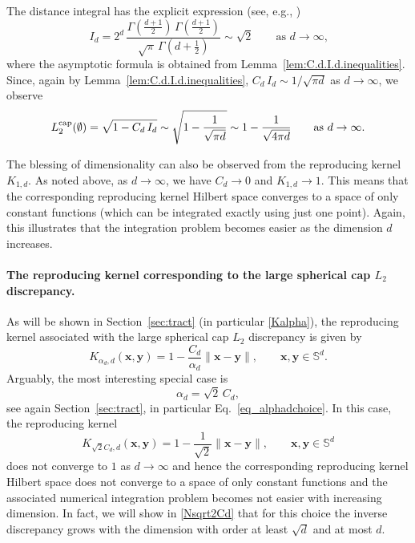 \documentclass[12pt]{article}
\newcommand{\cp}{{\rm cap}}
\begin{document}
The distance integral has the explicit expression (see, e.g., \cite{BSSW14})
\begin{equation}
\label{eq:I.d.value}
I_d = 2^d \, \frac{\Gamma( \tfrac{d + 1}{2} ) \, \Gamma( \tfrac{d + 1}{2} )}{\sqrt{\pi} \, \Gamma( d + \tfrac{1}{2} )}
\sim
\sqrt{2} 
\qquad
\text{as $d \to \infty$,}
\end{equation}
where the asymptotic formula is obtained from Lemma~\ref{lem:C.d.I.d.inequalities}. Since, again by Lemma~\ref{lem:C.d.I.d.inequalities}, $C_d \, I_d \sim 1/\sqrt{\pi d}$ as $d \to \infty$, we observe
\begin{equation*}
L_2^{\cp}(\emptyset) = \sqrt{1 - C_d \, I_d} \sim \sqrt{ 1 - \frac{1}{\sqrt{\pi d}}} \sim 1 - \frac{1}{\sqrt{4\pi d}} \qquad \text{as $d \to \infty$.}
\end{equation*}

The blessing of dimensionality can also be observed from the reproducing kernel $K_{1,d}$. As noted above, as $d \to \infty$, we have $C_d \to 0$ and $K_{1,d} \to 1$. This means that the corresponding reproducing kernel Hilbert space converges to a space of only constant functions (which can be integrated exactly using just one point). Again, this illustrates that the integration problem becomes easier as the dimension $d$ increases.


\paragraph{The reproducing kernel corresponding to the large spherical cap $L_2$ discrepancy.} As will be shown in Section~\ref{sec:tract} (in particular \eqref{Kalpha}), the reproducing kernel associated with the large spherical cap $L_2$ discrepancy is given by
\begin{equation*}
K_{\alpha_d, d}(\bm{x}, \bm{y}) = 1 - \frac{C_d}{\alpha_d} \|\bm{x} - \bm{y}\|, \qquad \bm{x},\bm{y} \in \mathbb{S}^d.
\end{equation*}
Arguably, the most interesting special case is
\begin{equation*}
\alpha_d = \sqrt{2} \, C_d,
\end{equation*}
see again Section~\ref{sec:tract}, in particular Eq.~\eqref{eq_alphadchoice}. In this case, the reproducing kernel 
\begin{equation}\label{Ksqrt2Cd}
K_{\sqrt{2} C_d,d}(\bm{x}, \bm{y}) = 1 - \frac{1}{\sqrt{2}} \|\bm{x} - \bm{y}\|, \qquad \bm{x},\bm{y} \in \mathbb{S}^d
\end{equation}
does not converge to $1$ as $d \to \infty$ and hence the corresponding reproducing kernel Hilbert space does not converge to a space of only constant functions and the associated numerical integration problem becomes not easier with increasing dimension. In fact, we will show in \eqref{Nsqrt2Cd} that for this choice the inverse discrepancy grows with the dimension with order at least $\sqrt{d}$ and at most $d$.
\end{document}
